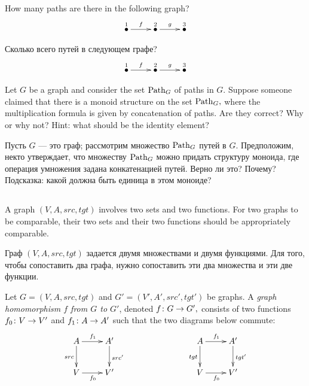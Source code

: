 \documentclass[../main/CT4S-EN-RU]{subfiles}
\begin{document}
\begin{exerciseENG}
How many paths are there in the following graph?
$$\xymatrix{\LMO{1}\ar[r]^{f}&\LMO{2}\ar[r]^{g}&\LMO{3}}$$
\end{exerciseENG}

\begin{exerciseRUS}
Сколько всего путей в следующем графе?
$$\xymatrix{
    \LMO{1} \ar[r]^{f}  &  \LMO{2} \ar[r]^{g}  &  \LMO{3}
}$$
\end{exerciseRUS}

\begin{exerciseENG}
Let $G$ be a graph and consider the set $\operatorname{Path}_G$ of paths in $G.$ Suppose someone claimed that there is a monoid structure on the set $\operatorname{Path}_G,$ where the multiplication formula is given by concatenation of paths. Are they correct? Why or why not? Hint: what should be the identity element?
\end{exerciseENG}

\begin{exerciseRUS}
Пусть $G$ — это граф; рассмотрим множество $\operatorname{Path}_G$ путей в $G.$ Предположим, некто утверждает, что множеству $\operatorname{Path}_G$ можно придать структуру моноида, где операция умножения задана конкатенацией путей. Верно ли это? Почему? Подсказка: какой должна быть единица в этом моноиде?
\end{exerciseRUS}


\subsection{}

\begin{blockENG}
A graph $(V,A,src,tgt)$ involves two sets and two functions. For two graphs to be comparable, their two sets and their two functions should be appropriately comparable.
\end{blockENG}

\begin{blockRUS}
Граф $(V,A,src,tgt)$ задается двумя множествами и двумя функциями. Для того, чтобы сопоставить два графа, нужно сопоставить эти два множества и эти две функции.
\end{blockRUS}

\begin{definitionENG}\label{def:graph homomorphism}
Let $G=(V,A,src,tgt)$ and $G'=(V',A',src',tgt')$ be graphs. A {\em graph homomorphism $f$ from $G$ to $G'$}, denoted $f\colon G\rightarrow G',$ consists of two functions $f_0\colon V\rightarrow V'$ and $f_1\colon A\rightarrow A'$ such that the two diagrams below commute:
\begin{align}\label{dia:graph hom}
\xymatrix{A\ar[r]^{f_1}\ar[d]_{src}&A'\ar[d]^{src'}\\V\ar[r]_{f_0}&V'
}\hspace{1in}
\xymatrix{A\ar[r]^{f_1}\ar[d]_{tgt}&A'\ar[d]^{tgt'}\\V\ar[r]_{f_0}&V'
}
\end{align}
\end{definitionENG}
\end{document}

